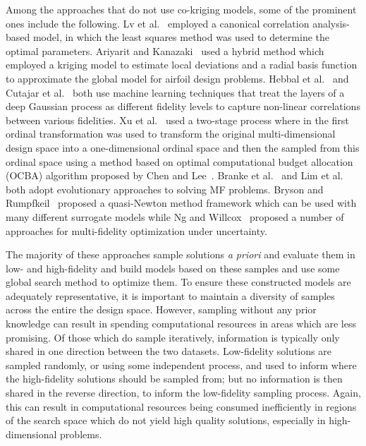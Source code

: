 Among the approaches that do not use co-kriging models, some of the prominent ones include the following. Lv et al.~\cite{lv2021multi} employed a canonical correlation analysis-based model, in which the least squares method was used to determine the optimal parameters. Ariyarit and Kanazaki~\cite{ariyarit2017multi} used a hybrid method which employed a kriging model to estimate local deviations and a radial basis function to approximate the global model for airfoil design problems. Hebbal et al.~\cite{hebbal2021multi} and Cutajar et al.~\cite{cutajar2019deep} both use machine learning techniques that treat the layers of a deep Gaussian process as different fidelity levels to capture non-linear correlations between various fidelities. Xu et al.~\cite{xu2016mo2tos} used a two-stage process where in the first ordinal transformation was used to transform the original multi-dimensional design space into a one-dimensional ordinal space and then the sampled from this ordinal space using a method based on optimal computational budget allocation (OCBA) algorithm proposed by Chen and Lee~\cite{chen2011stochastic}. Branke et al.~\cite{branke2016efficient} and Lim et al.~\cite{lim2008evolutionary} both adopt evolutionary approaches to solving MF problems. Bryson and Rumpfkeil~\cite{bryson2018multifidelity} proposed a quasi-Newton method framework which can be used with many different surrogate models  while Ng and Willcox~\cite{ng2014multifidelity} proposed a number of approaches for multi-fidelity optimization under uncertainty.

The majority of these approaches sample solutions \emph{a priori} and evaluate them in low- and high-fidelity and build models based on these samples and use some global search method to optimize them. To ensure these constructed models are adequately representative, it is important to maintain a diversity of samples across the entire the design space. However, sampling without any prior knowledge can result in spending computational resources in areas which are less promising. Of those which do sample iteratively, information is typically only shared in one direction between the two datasets. Low-fidelity solutions are sampled randomly, or using some independent process, and used to inform where the high-fidelity solutions should be sampled from; but no information is then shared in the reverse direction, to inform the low-fidelity sampling process. Again, this can result in computational resources being consumed inefficiently in regions of the search space which do not yield high quality solutions, especially in high-dimensional problems. 

